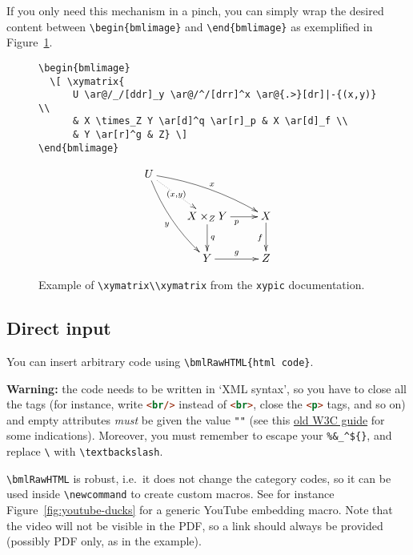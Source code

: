 \documentclass[a4paper,british]{article}
\def\ltxinline{\lstinline[style=bookml]}
\def\htmlinline{\lstinline[language=html]}
\begin{document}
If you only need this mechanism in a pinch, you can simply wrap the desired content between \ltxinline|\begin{bmlimage}| and \ltxinline|\end{bmlimage}| as exemplified in Figure~\ref{fig:xymatrix}.
\begin{figure}
  \begin{lstlisting}[style=bookml]
\begin{bmlimage}
  \[ \xymatrix{
      U \ar@/_/[ddr]_y \ar@/^/[drr]^x \ar@{.>}[dr]|-{(x,y)} \\
      & X \times_Z Y \ar[d]^q \ar[r]_p & X \ar[d]_f \\
      & Y \ar[r]^g & Z} \]
\end{bmlimage}
  \end{lstlisting}
  \begin{bmlimage}
    \[ \xymatrix{
        U \ar@/_/[ddr]_y \ar@/^/[drr]^x \ar@{.>}[dr]|-{(x,y)} \\
        & X \times_Z Y \ar[d]^q \ar[r]_p & X \ar[d]_f \\
        & Y \ar[r]^g & Z} \]
  \end{bmlimage}
  \caption{Example of \iflatexml\ltxinline|\xymatrix|\else\ltxinline|\\xymatrix|\fi{} from the \ltxinline|xypic| documentation.}
  \label{fig:xymatrix}
\end{figure}

\subsection{Direct \HTML{} input}

You can insert arbitrary \HTML{} code using \ltxinline|\bmlRawHTML{html code}|.

\textbf{Warning:} the \HTML{} code needs to be written in `XML syntax', so you have to close all the tags (for instance, write \htmlinline|<br/>| instead of \htmlinline|<br>|, close the \htmlinline|<p>| tags, and so on) and empty attributes \emph{must} be given the value \htmlinline|""| (see this \href{https://dev.w3.org/html5/html-author/#elements}{old W3C guide} for some indications). Moreover, you must remember to escape your \ltxinline|%

\ltxinline|\bmlRawHTML| is robust, i.e.\ it does not change the category codes, so it can be used inside \ltxinline|\newcommand| to create custom macros. See for instance Figure~\ref{fig:youtube-ducks} for a generic YouTube embedding macro. Note that the video will not be visible in the PDF, so a link should always be provided (possibly PDF only, as in the example).
\end{document}
